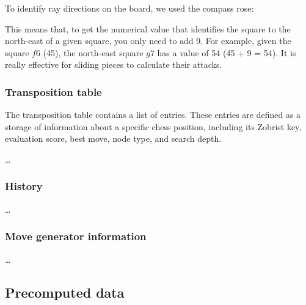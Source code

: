 \vspace{1em}

\noindent To identify ray directions on the board, we used the compass rose:

\begin{center}
\end{center}

\noindent This means that, to get the numerical value that identifies the square to the north-east of a given square, you only need to add 9. For example, given the square $f6$ (45), the north-east square $g7$ has a value of 54 (45 + 9 = 54). It is really effective for sliding pieces to calculate their attacks.

\subsubsection{Transposition table}

The transposition table contains a list of entries. These entries are defined as a storage of information about a specific chess position, including its Zobrist key, evaluation score, best move, node type, and search depth.

\ldots

\subsubsection{History}

\ldots

\subsubsection{Move generator information}

\ldots

\subsection{Precomputed data}

